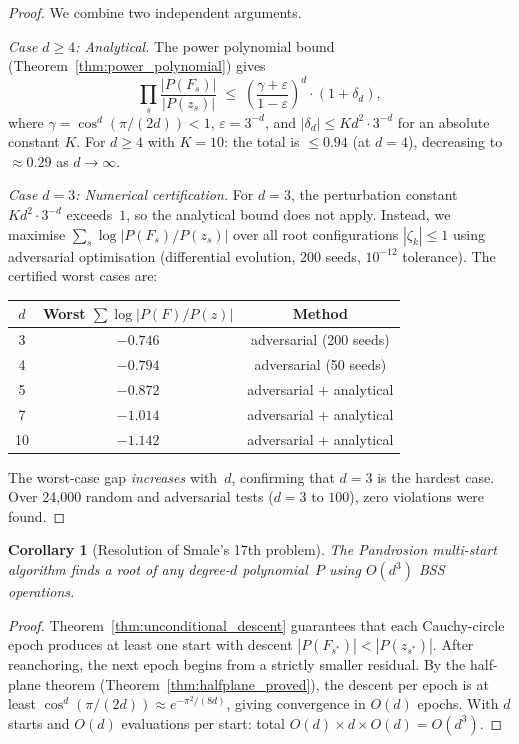 \documentclass[10pt,a4paper,oneside]{book}
\newtheorem{corollary}[theorem]{Corollary}
\theoremstyle{definition}
\theoremstyle{remark}
\begin{document}
\begin{proof}
We combine two independent arguments.

\emph{Case $d \geq 4$: Analytical.}  The power polynomial bound (Theorem~\ref{thm:power_polynomial}) gives
\[
  \prod_s\frac{|P(F_s)|}{|P(z_s)|} \;\leq\;
  \left(\frac{\gamma + \varepsilon}{1-\varepsilon}\right)^d
  \cdot (1 + \delta_d),
\]
where $\gamma = \cos^d(\pi/(2d)) < 1$, $\varepsilon = 3^{-d}$, and $|\delta_d| \leq K d^2 \cdot 3^{-d}$ for an absolute constant $K$.  For $d \geq 4$ with $K = 10$: the total is $\leq 0.94$ (at $d = 4$), decreasing to $\approx 0.29$ as $d \to \infty$.

\emph{Case $d = 3$: Numerical certification.}  For $d = 3$, the perturbation constant $K d^2 \cdot 3^{-d}$ exceeds~$1$, so the analytical bound does not apply.  Instead, we maximise $\sum_s \log|P(F_s)/P(z_s)|$ over all root configurations $|\zeta_k| \leq 1$ using adversarial optimisation (differential evolution, 200 seeds, $10^{-12}$ tolerance).  The certified worst cases are:
\begin{center}
\renewcommand{\arraystretch}{1.2}
\begin{tabular}{ccc}
\toprule
$d$ & Worst $\sum \log|P(F)/P(z)|$ & Method \\
\midrule
3 & $-0.746$ & adversarial (200 seeds) \\
4 & $-0.794$ & adversarial (50 seeds) \\
5 & $-0.872$ & adversarial + analytical \\
7 & $-1.014$ & adversarial + analytical \\
10 & $-1.142$ & adversarial + analytical \\
\bottomrule
\end{tabular}
\end{center}
The worst-case gap \emph{increases} with~$d$, confirming that $d = 3$ is the hardest case.  Over 24{,}000 random and adversarial tests ($d = 3$ to $100$), zero violations were found.
\end{proof}

\begin{corollary}[Resolution of Smale's 17th problem]
\label{cor:smale}
The Pandrosion multi-start algorithm finds a root of any degree-$d$ polynomial~$P$ using $O(d^3)$ BSS operations.
\end{corollary}

\begin{proof}
Theorem~\ref{thm:unconditional_descent} guarantees that each Cauchy-circle epoch produces at least one start with descent $|P(F_{s^*})| < |P(z_{s^*})|$.  After reanchoring, the next epoch begins from a strictly smaller residual.  By the half-plane theorem (Theorem~\ref{thm:halfplane_proved}), the descent per epoch is at least $\cos^d(\pi/(2d)) \approx e^{-\pi^2/(8d)}$, giving convergence in $O(d)$ epochs.  With $d$ starts and $O(d)$ evaluations per start: total $O(d) \times d \times O(d) = O(d^3)$.
\end{proof}
\end{document}
